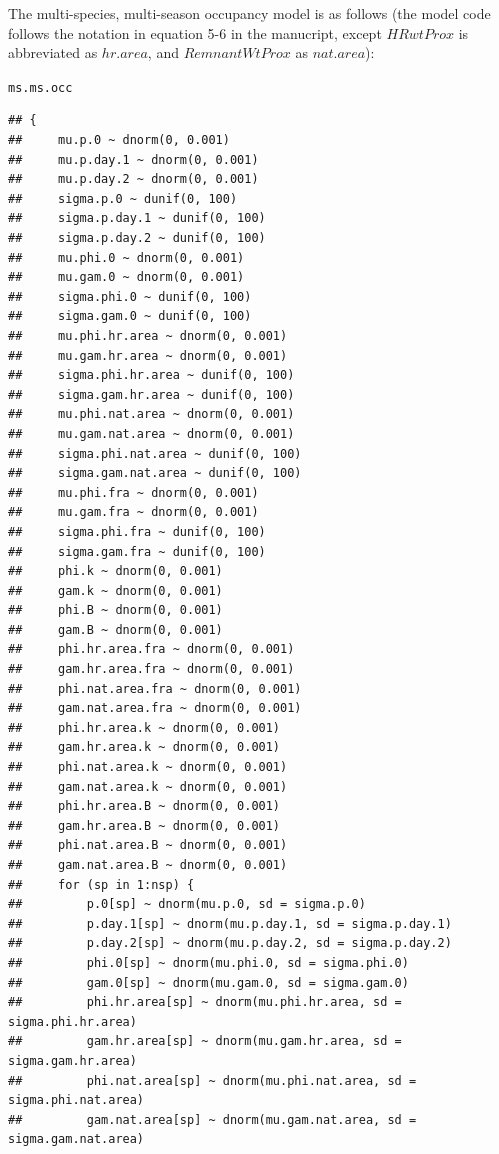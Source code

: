 \documentclass{article}\usepackage[]{graphicx}\usepackage[]{color}
\makeatletter
\newcommand{\hlstd}[1]{\textcolor[rgb]{0.345,0.345,0.345}{#1}}%
\newenvironment{kframe}{%
 \def\at@end@of@kframe{}%
 \ifinner\ifhmode%
  \def\at@end@of@kframe{\end{minipage}}%
  \begin{minipage}{\columnwidth}%
 \fi\fi%
 \def\FrameCommand##1{\hskip\@totalleftmargin \hskip-\fboxsep
 \colorbox{shadecolor}{##1}\hskip-\fboxsep
     \hskip-\linewidth \hskip-\@totalleftmargin \hskip\columnwidth}%
 \MakeFramed {\advance\hsize-\width
   \@totalleftmargin\z@ \linewidth\hsize
   \@setminipage}}%
 {\par\unskip\endMakeFramed%
 \at@end@of@kframe}
\newenvironment{knitrout}{}{} %
\makeatother
\begin{document}
The multi-species, multi-season occupancy model is as follows (the
model code follows the notation in equation 5-6 in the manucript,
except $HRwtProx$ is abbreviated as $hr.area$, and $RemnantWtProx$ as
$nat.area$):


\begin{knitrout}
\color{fgcolor}\begin{kframe}
\begin{alltt}
\hlstd{ms.ms.occ}
\end{alltt}
\begin{verbatim}
## {
##     mu.p.0 ~ dnorm(0, 0.001)
##     mu.p.day.1 ~ dnorm(0, 0.001)
##     mu.p.day.2 ~ dnorm(0, 0.001)
##     sigma.p.0 ~ dunif(0, 100)
##     sigma.p.day.1 ~ dunif(0, 100)
##     sigma.p.day.2 ~ dunif(0, 100)
##     mu.phi.0 ~ dnorm(0, 0.001)
##     mu.gam.0 ~ dnorm(0, 0.001)
##     sigma.phi.0 ~ dunif(0, 100)
##     sigma.gam.0 ~ dunif(0, 100)
##     mu.phi.hr.area ~ dnorm(0, 0.001)
##     mu.gam.hr.area ~ dnorm(0, 0.001)
##     sigma.phi.hr.area ~ dunif(0, 100)
##     sigma.gam.hr.area ~ dunif(0, 100)
##     mu.phi.nat.area ~ dnorm(0, 0.001)
##     mu.gam.nat.area ~ dnorm(0, 0.001)
##     sigma.phi.nat.area ~ dunif(0, 100)
##     sigma.gam.nat.area ~ dunif(0, 100)
##     mu.phi.fra ~ dnorm(0, 0.001)
##     mu.gam.fra ~ dnorm(0, 0.001)
##     sigma.phi.fra ~ dunif(0, 100)
##     sigma.gam.fra ~ dunif(0, 100)
##     phi.k ~ dnorm(0, 0.001)
##     gam.k ~ dnorm(0, 0.001)
##     phi.B ~ dnorm(0, 0.001)
##     gam.B ~ dnorm(0, 0.001)
##     phi.hr.area.fra ~ dnorm(0, 0.001)
##     gam.hr.area.fra ~ dnorm(0, 0.001)
##     phi.nat.area.fra ~ dnorm(0, 0.001)
##     gam.nat.area.fra ~ dnorm(0, 0.001)
##     phi.hr.area.k ~ dnorm(0, 0.001)
##     gam.hr.area.k ~ dnorm(0, 0.001)
##     phi.nat.area.k ~ dnorm(0, 0.001)
##     gam.nat.area.k ~ dnorm(0, 0.001)
##     phi.hr.area.B ~ dnorm(0, 0.001)
##     gam.hr.area.B ~ dnorm(0, 0.001)
##     phi.nat.area.B ~ dnorm(0, 0.001)
##     gam.nat.area.B ~ dnorm(0, 0.001)
##     for (sp in 1:nsp) {
##         p.0[sp] ~ dnorm(mu.p.0, sd = sigma.p.0)
##         p.day.1[sp] ~ dnorm(mu.p.day.1, sd = sigma.p.day.1)
##         p.day.2[sp] ~ dnorm(mu.p.day.2, sd = sigma.p.day.2)
##         phi.0[sp] ~ dnorm(mu.phi.0, sd = sigma.phi.0)
##         gam.0[sp] ~ dnorm(mu.gam.0, sd = sigma.gam.0)
##         phi.hr.area[sp] ~ dnorm(mu.phi.hr.area, sd = sigma.phi.hr.area)
##         gam.hr.area[sp] ~ dnorm(mu.gam.hr.area, sd = sigma.gam.hr.area)
##         phi.nat.area[sp] ~ dnorm(mu.phi.nat.area, sd = sigma.phi.nat.area)
##         gam.nat.area[sp] ~ dnorm(mu.gam.nat.area, sd = sigma.gam.nat.area)

\end{verbatim}
\end{kframe}
\end{knitrout}
\end{document}
